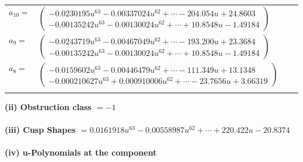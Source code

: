 \documentclass[1p]{elsarticle_modified}
\theoremstyle{definition}
\begin{document}
\begin{tabular}{m{7pt} m{180pt} m{7pt} m{180pt} }
\flushright $a_{10}=$&$\begin{pmatrix}-0.0230195 u^{63}-0.00337024 u^{62}+\cdots-204.054 u+24.8603\\-0.00135242 u^{63}-0.00130024 u^{62}+\cdots+10.8548 u-1.49184\end{pmatrix}$ \\
\flushright $a_{9}=$&$\begin{pmatrix}-0.0243719 u^{63}-0.00467049 u^{62}+\cdots-193.200 u+23.3684\\-0.00135242 u^{63}-0.00130024 u^{62}+\cdots+10.8548 u-1.49184\end{pmatrix}$ \\
\flushright $a_{8}=$&$\begin{pmatrix}-0.0159602 u^{63}-0.00446479 u^{62}+\cdots-111.349 u+13.1348\\-0.000210627 u^{63}+0.000910006 u^{62}+\cdots-23.7656 u+3.66319\end{pmatrix}$\\&\end{tabular}
\flushleft \textbf{(ii) Obstruction class $= -1$}\\~\\
\flushleft \textbf{(iii) Cusp Shapes $= 0.0161918 u^{63}-0.00558987 u^{62}+\cdots+220.422 u-20.8374$}\\~\\
\newpage\renewcommand{\arraystretch}{1}
\flushleft \textbf{(iv) u-Polynomials at the component}\newline \\
\end{document}
